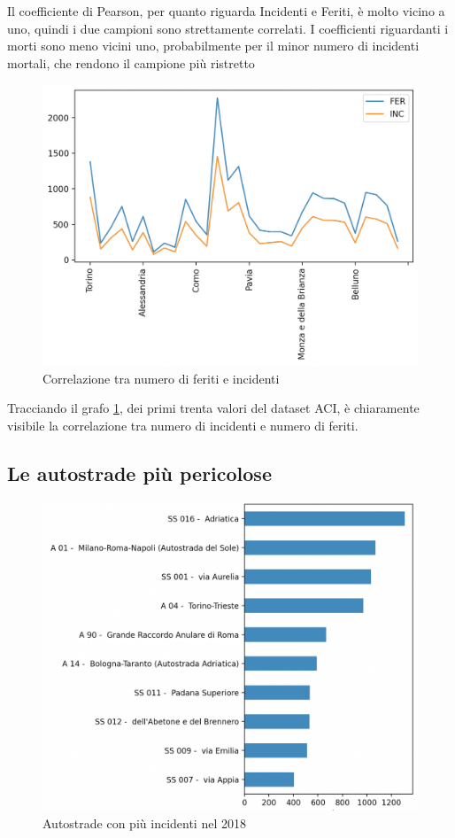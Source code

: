 \documentclass[a4paper]{report}
\begin{document}
Il coefficiente di Pearson, per quanto riguarda Incidenti e Feriti, 
è molto vicino a uno, quindi i due campioni sono strettamente correlati.
I coefficienti riguardanti i morti sono meno vicini uno, probabilmente per il minor numero 
di incidenti mortali, che rendono il campione più ristretto

\begin{figure}
    \includegraphics[width=\linewidth]{../src/incidenti/incidenti_aci/comuni/corr_incidenti_feriti.png}
    \caption{Correlazione tra numero di feriti e incidenti}
    \label{fig:corr-incidenti-feriti}
\end{figure}

Tracciando il grafo \ref{fig:corr-incidenti-feriti}, dei primi trenta valori del dataset ACI, 
è chiaramente visibile la correlazione tra numero di incidenti e numero di feriti.


\subsection{Le autostrade più pericolose}
\begin{figure}
    \includegraphics[width=\linewidth]{../src/incidenti/incidenti_aci/autostrade/autostrade.png}
    \caption{Autostrade con più incidenti nel 2018}
    \label{fig:incidenti-autostrade}
\end{figure}
\end{document}
